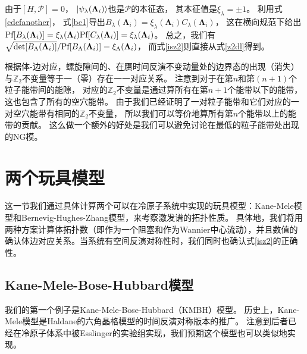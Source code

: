 由于$[H,\mathcal P]=0$，
$\ket{\psi_\lambda(\boldsymbol{\Lambda} _i)}$也是$\mathcal P$的本征态，
其本征值是$\xi_\lambda =\pm 1$。
利用式\eqref{cdefanother}，
式\eqref{bc1}导出$B_\lambda (\boldsymbol{\Lambda} _i)=\xi_\lambda (\boldsymbol{\Lambda} _i)C_\lambda (\boldsymbol{\Lambda} _i)$，
这在横向规范下给出$\textnormal{Pf}[B_\lambda (\boldsymbol{\Lambda} _i)]=\xi_\lambda (\boldsymbol{\Lambda} _i)\textnormal{Pf}[C_\lambda (\boldsymbol{\Lambda} _i)]=\xi_\lambda (\boldsymbol{\Lambda} _i)$。
总之，我们有$\sqrt{\det[B_\Lambda (\boldsymbol{\Lambda} _i)]}/\textnormal{Pf}[B_\Lambda (\boldsymbol{\Lambda} _i)] =\xi_\Lambda (\boldsymbol{\Lambda} _i)$，
而式\eqref{isz2}则直接从式\eqref{z2dl}得到。

根据体-边对应，螺旋隙间的、在赝时间反演不变动量处的边界态的出现（消失）与$\mathbb Z_2$不变量等于一（零）存在一一对应关系。
注意到对于在第$n$和第$(n+1)$个粒子能带间的能隙，
对应的$\mathbb Z_2$不变量是通过算所有在第$n+1$个能带以下的能带，
这也包含了所有的空穴能带。
由于我们已经证明了一对粒子能带和它们对应的一对空穴能带有相同的$\mathbb Z_2$不变量，
所以我们可以等价地算所有第$n$个能带以上的能带的贡献。
这么做一个额外的好处是我们可以避免讨论在最低的粒子能带处出现的NG模\cite{Furukawa2015}。




\section{两个玩具模型}\label{sec3}
这一节我们通过具体计算两个可以在冷原子系统中实现的玩具模型：Kane-Mele模型和Bernevig-Hughes-Zhang模型，来考察激发谱的拓扑性质。
具体地，我们将用两种方案计算体拓扑数（即作为一个阻塞和作为Wannier中心流动），并且数值的确认体边对应关系。当系统有空间反演对称性时，我们同时也确认式\eqref{isz2}的正确性。

\subsection{Kane-Mele-Bose-Hubbard模型}
我们的第一个例子是Kane-Mele-Bose-Hubbard（KMBH）模型。
历史上，Kane-Mele模型\cite{Kane2005}是Haldane的六角晶格模型\cite{Haldane1988}的时间反演对称版本的推广。
注意到后者已经在冷原子体系中被Esslinger的实验组实现，我们预期这个模型也可以类似地实现。

